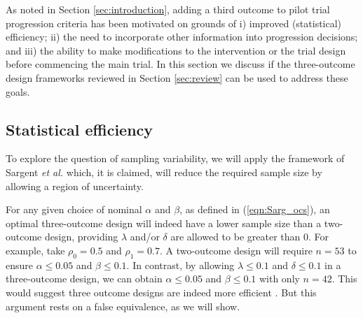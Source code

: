 \documentclass[Crown, times, sagev]{sagej}
\begin{document}
As noted in Section \ref{sec:introduction}, adding a third outcome to pilot trial progression criteria has been motivated on grounds of i) improved (statistical) efficiency; ii) the need to incorporate other information into progression decisions; and iii) the ability to make modifications to the intervention or the trial design before commencing the main trial. In this section we discuss if the three-outcome design frameworks reviewed in Section \ref{sec:review} can be used to address these goals.

\subsection{Statistical efficiency}\label{sec:efficiency}

To explore the question of sampling variability, we will apply the framework of Sargent \emph{et al.} \cite{Sargent2001} which, it is claimed, will reduce the required sample size by allowing a region of uncertainty.

For any given choice of nominal $\alpha$ and $\beta$, as defined in (\ref{eqn:Sarg_ocs}), an optimal three-outcome design will indeed have a lower sample size than a two-outcome design, providing $\lambda$ and/or $\delta$ are allowed to be greater than 0. For example, take $\rho_0 = 0.5$ and $\rho_1 = 0.7$. A two-outcome design will require $n = 53$ to ensure $\alpha \leq 0.05$ and $\beta \leq 0.1$. In contrast, by allowing $\lambda \leq 0.1$ and $\delta \leq 0.1$ in a three-outcome design, we can obtain $\alpha \leq 0.05$ and $\beta \leq 0.1$ with only $n = 42$. This would suggest three outcome designs are indeed more efficient \cite{Sargent2001, Hong2007}. But this argument rests on a false equivalence, as we will show.
\end{document}
